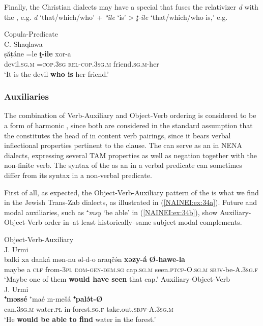 \documentclass[output=paper,colorlinks,citecolor=brown,draftmode]{langscibook}
\begin{document}
Finally, the Christian dialects may have a special  that fuses the relativizer \textit{d} with the , e.g. \textit{d }`that/which/who' + \textit{ʾile} `is' > \textit{ṱ-ile} `that/which/who is,' e.g.

\ea\label{NAINEI:ex:33}
Copula-Predicate\\
C. Shaqlawa \citep[Text 4:§42]{Khanetal2022FolkloreII} \\
\gll ṣăṭáne =le \textbf{ṱ-ile} xor-a \\
     devil\textsc{.sg.m} \textsc{=cop.3sg} \textsc{rel-cop.3sg.m} friend\textsc{.sg.m-}her \\
\glt `It is the devil \textbf{who is} her friend.'
\z

\subsubsection{Auxiliaries}\label{NAINEI:sec:2.3.2}
The combination of Verb-Auxiliary and Object-Verb ordering is considered to be a form of harmonic  \parencite[e.g.][100]{Dryer1992Greeburg}, since both are considered  in the standard assumption that the  constitutes the head of  in content verb pairings, since it bears verbal inflectional properties pertinent to the clause. The  can serve as an  in NENA dialects, expressing several TAM properties as well as negation together with the non-finite verb. The syntax of the  as an  in a verbal predicate can sometimes differ from its syntax in a non-verbal predicate.

First of all, as expected, the Object-Verb-Auxiliary pattern of the  is what we find in the Jewish Trans-Zab dialects, as illustrated in (\ref{NAINEI:ex:34a}). Future and modal auxiliaries, such as ⁺\textit{msy} `be able' in (\ref{NAINEI:ex:34b}), show Auxiliary-Object-Verb order in–at least historically–same subject modal complements.

\ea
\ea\label{NAINEI:ex:34a}
Object-Verb-Auxiliary\\
J. Urmi \citep[194]{Garbell1065a} \\
\gll balki xa danká mən-nu əl-d-o araqčə́n \textbf{xəzy-á} \textbf{Ø-hawe-la} \\
     maybe a \textsc{clf} from\textsc{-3pl} \textsc{dom-gen-dem.sg} cap\textsc{.sg.m} seen\textsc{.ptcp-O.sg.m} \textsc{sbjv-}be\textsc{-A.3sg.f} \\
\glt `Maybe one of them \textbf{would have seen} that cap.'
\ex\label{NAINEI:ex:34b}
Auxiliary-Object-Verb\\
J. Urmi \citep[194]{Garbell1065a} \\
\gll \textbf{⁺məssé} ⁺maé m-mešá \textbf{⁺palə́t-Ø} \\
    can\textsc{.3sg.m} water\textsc{.pl} in-forest\textsc{.sg.f} take.out\textsc{.sbjv-A.3sg.m} \\
\glt `He \textbf{would be able to find} water in the forest.'
\z
\z
\end{document}
